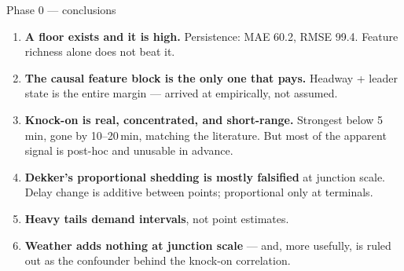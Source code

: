 \documentclass[aspectratio=169,10pt]{beamer}
\begin{document}
\begin{frame}{Phase 0 --- conclusions}
  \begin{enumerate}
    \item \textbf{A floor exists and it is high.} Persistence: MAE 60.2, RMSE 99.4. Feature
      richness alone does not beat it.
    \item \textbf{The causal feature block is the only one that pays.} Headway + leader state
      is the entire margin --- arrived at empirically, not assumed.
    \item \textbf{Knock-on is real, concentrated, and short-range.} Strongest below 5\,min,
      gone by 10--20\,min, matching the literature. But most of the apparent signal is
      post-hoc and unusable in advance.
    \item \textbf{Dekker's proportional shedding is mostly falsified} at junction scale.
      Delay change is additive between points; proportional only at terminals.
    \item \textbf{Heavy tails demand intervals}, not point estimates.
    \item \textbf{Weather adds nothing at junction scale} --- and, more usefully, is ruled out
      as the confounder behind the knock-on correlation.
  \end{enumerate}
\end{frame}
\end{document}
